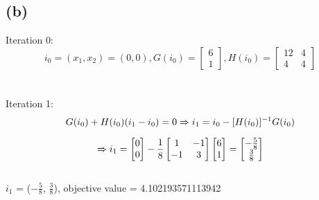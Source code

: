 \documentclass{article}
\begin{document}
\subsection{(b)}
Iteration 0:
\begin{equation*}
i_0 = (x_1, x_2) = (0, 0), G(i_0) = 
\begin{bmatrix}
6 \\
1
\end{bmatrix}
, H(i_0) = 
\begin{bmatrix}
12 & 4 \\
4 & 4
\end{bmatrix}
\end{equation*}
\\
\\Iteration 1:
\begin{equation*}
G(i_0) + H(i_0)(i_1 - i_0) = 0 \xRightarrow{} i_1 = i_0 - [H(i_0)]^{-1}G(i_0)
\end{equation*}
\begin{equation*}
\xRightarrow{} i_1 =
\begin{bmatrix}
0 \\
0
\end{bmatrix}
- {\frac{1}{8}}
\begin{bmatrix}
1 & -1\\
-1 & 3
\end{bmatrix}
\begin{bmatrix}
6\\
1
\end{bmatrix}
=
\begin{bmatrix}
-{\frac{5}{8}}\\
{\frac{3}{8}}
\end{bmatrix}
\end{equation*}
\\$i_1$ = ($-{\frac{5}{8}}$, ${\frac{3}{8}}$), objective value = 4.102193571113942
\end{document}
